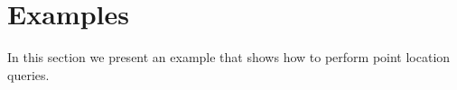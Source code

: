 
\section{Examples}
\label{sec:vda2-examples}

In this section we present an example that shows how to perform point
location queries.

%

